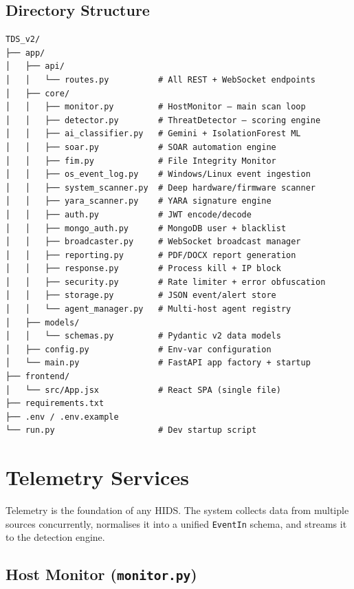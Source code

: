 \documentclass[12pt,a4paper]{article}
\begin{document}
\subsection{Directory Structure}

\begin{lstlisting}[style=bash, caption={Project directory layout}]
TDS_v2/
├── app/
│   ├── api/
│   │   └── routes.py          # All REST + WebSocket endpoints
│   ├── core/
│   │   ├── monitor.py         # HostMonitor — main scan loop
│   │   ├── detector.py        # ThreatDetector — scoring engine
│   │   ├── ai_classifier.py   # Gemini + IsolationForest ML
│   │   ├── soar.py            # SOAR automation engine
│   │   ├── fim.py             # File Integrity Monitor
│   │   ├── os_event_log.py    # Windows/Linux event ingestion
│   │   ├── system_scanner.py  # Deep hardware/firmware scanner
│   │   ├── yara_scanner.py    # YARA signature engine
│   │   ├── auth.py            # JWT encode/decode
│   │   ├── mongo_auth.py      # MongoDB user + blacklist
│   │   ├── broadcaster.py     # WebSocket broadcast manager
│   │   ├── reporting.py       # PDF/DOCX report generation
│   │   ├── response.py        # Process kill + IP block
│   │   ├── security.py        # Rate limiter + error obfuscation
│   │   ├── storage.py         # JSON event/alert store
│   │   └── agent_manager.py   # Multi-host agent registry
│   ├── models/
│   │   └── schemas.py         # Pydantic v2 data models
│   ├── config.py              # Env-var configuration
│   └── main.py                # FastAPI app factory + startup
├── frontend/
│   └── src/App.jsx            # React SPA (single file)
├── requirements.txt
├── .env / .env.example
└── run.py                     # Dev startup script
\end{lstlisting}

\section{Telemetry Services}

Telemetry is the foundation of any HIDS. The system collects data from multiple
sources concurrently, normalises it into a unified \texttt{EventIn} schema,
and streams it to the detection engine.

\subsection{Host Monitor (\texttt{monitor.py})}
\end{document}
